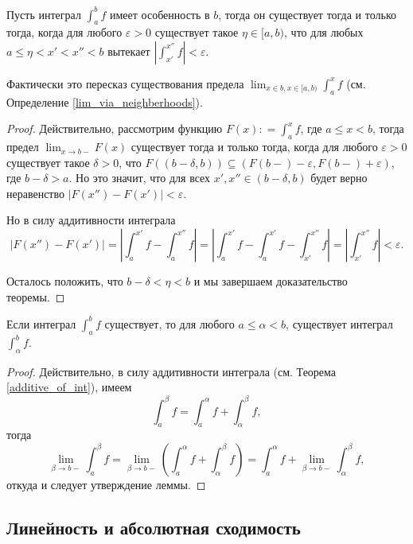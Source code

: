 \begin{theorem}\label{Coushy_for_int}
    Пусть интеграл $\int_a^b f$ имеет особенность в $b$, тогда он существует тогда и только тогда, когда для любого $\varepsilon >0$ существует такое $\eta \in [a,b)$, что для любых $a \le \eta < x' <x'' <b$ вытекает $\left| \int_{x'}^{x''} f \right| < \varepsilon.$
\end{theorem}
Фактически это пересказ существования предела $\lim_{x \in b, x \in [a,b)} \int_a^x f$ (см. Определение \ref{lim_via_neighberhoods}).

\begin{proof}
Действительно, рассмотрим функцию $F(x): = \int_a^x f$, где $a\le x <b$, тогда предел $\lim_{x \to b-}F(x)$ существует тогда и только тогда, когда для любого $\varepsilon>0$ существует такое $\delta>0$, что $F((b-\delta,b)) \subseteq (F(b-)-\varepsilon, F(b-)+\varepsilon)$, где $b - \delta > a.$ Но это значит, что для всех $x', x'' \in (b-\delta,b)$ будет верно неравенство $|F(x'') - F(x')| < \varepsilon$. 

Но в силу аддитивности интеграла
\[
 |F(x'') - F(x')| = \left| \int_a^{x'}f - \int_a^{x''}f   \right| = \left| \int_a^{x'}f - \int_a^{x'} f - \int_{x'}^{x''}f \right| = \left| \int_{x'}^{x''}f \right| < \varepsilon.
\]

Осталось положить, что $b-\delta < \eta < b$ и мы завершаем доказательство теоремы.
\end{proof}


\begin{lemma}\label{good_lemma_for_nonproper_int}
    Если интеграл $\int_a^b f$ существует, то для любого $a \le \alpha <b$, существует интеграл $\int_\alpha^b f.$
\end{lemma}

\begin{proof}
    Действительно, в силу аддитивности интеграла (см. Теорема \ref{additive_of_int}), имеем
    \[
     \int_a^\beta f = \int_a^\alpha f + \int_\alpha^\beta f,
    \]
    тогда
\[
\lim_{\beta \to b-}  \int_a^\beta f = \lim_{\beta \to b-} \left( \int_a^\alpha f + \int_\alpha^\beta f \right) = \int_a^\alpha f + \lim_{\beta \to b-}  \int_\alpha^\beta f ,
\]
откуда и следует утверждение леммы.
\end{proof}


\subsection{Линейность и абсолютная сходимость}

